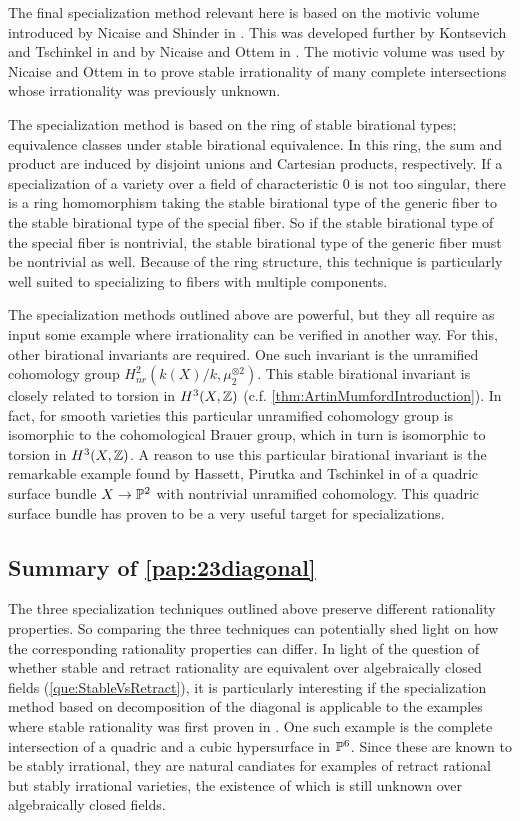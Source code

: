 The final specialization method relevant here is based on the motivic volume introduced by Nicaise and Shinder in \cite{NicaiseShinderMotivic}. This was developed further by Kontsevich and Tschinkel in \cite{KontsevichTschinkelSpecialization} and by Nicaise and Ottem in \cite{NicaiseOttemRefinement}. The motivic volume was used by Nicaise and Ottem in \cite{NicaiseOttem} to prove stable irrationality of many complete intersections whose irrationality was previously unknown.

The specialization method is based on the ring of stable birational types; equivalence classes under stable birational equivalence. In this ring, the sum and product are induced by disjoint unions and Cartesian products, respectively. If a specialization of a variety over a field of characteristic 0 is not too singular, there is a ring homomorphism taking the stable birational type of the generic fiber to the stable birational type of the special fiber. So if the stable birational type of the special fiber is nontrivial, the stable birational type of the generic fiber must be nontrivial as well. Because of the ring structure, this technique is particularly well suited to specializing to fibers with multiple components.

The specialization methods outlined above are powerful, but they all require as input some example where irrationality can be verified in another way. For this, other birational invariants are required. One such invariant is the unramified cohomology group $H_{nr}^2(k(X)/k,\mu_2^{\otimes 2})$. This stable birational invariant is closely related to torsion in $H^3(X,\Z)$ (c.f. \cref{thm:ArtinMumfordIntroduction}). In fact, for smooth varieties this particular unramified cohomology group is isomorphic to the cohomological Brauer group, which in turn is isomorphic to torsion in $H^3(X,\Z)$. A reason to use this particular birational invariant is the remarkable example found by Hassett, Pirutka and Tschinkel in \cite{HPTActa} of a quadric surface bundle $X \to \P^2$ with nontrivial unramified cohomology. This quadric surface bundle has proven to be a very useful target for specializations.

\subsection{Summary of \cref{pap:23diagonal}}
The three specialization techniques outlined above preserve different rationality properties. So comparing the three techniques can potentially shed light on how the corresponding rationality properties can differ. In light of the question of whether stable and retract rationality are equivalent over algebraically closed fields (\cref{que:StableVsRetract}), it is particularly interesting if the specialization method based on decomposition of the diagonal is applicable to the examples where stable rationality was first proven in \cite{NicaiseOttem}. One such example is the complete intersection of a quadric and a cubic hypersurface in $\P^6$. Since these are known to be stably irrational, they are natural candiates for examples of retract rational but stably irrational varieties, the existence of which is still unknown over algebraically closed fields.

